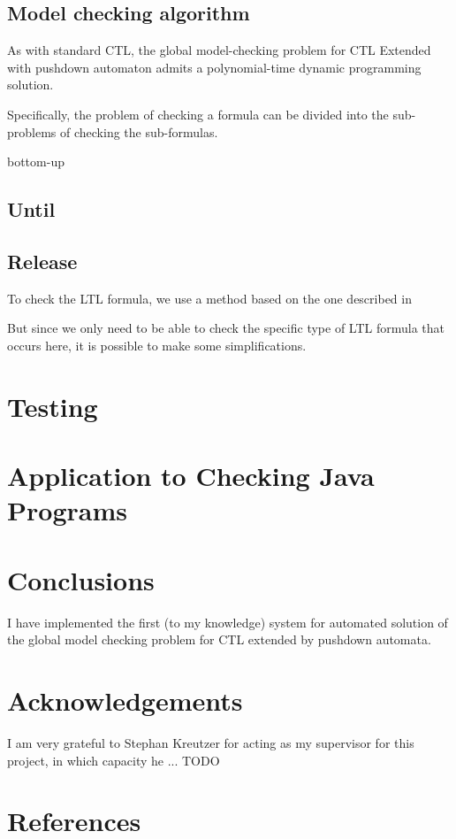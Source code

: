 \documentclass[11pt]{article}
\begin{document}
\subsection{Model checking algorithm}

As with standard CTL, the global model-checking problem for CTL Extended with
pushdown automaton admits a polynomial-time dynamic programming solution.

Specifically, the problem of checking a formula can be divided into the
sub-problems of checking the sub-formulas. %

bottom-up


\subsection{Until}

\subsection{Release}
To check the LTL formula, we use a method based on the one described in \cite{EHRS00b} %

But since we only need to be able to check the specific type of LTL formula
that occurs here, it is possible to make some simplifications.

\section{Testing}

\section{Application to Checking Java Programs}

\section{Conclusions}

I have implemented the first (to my knowledge) system for automated solution of
the global model checking problem for CTL extended by pushdown automata.

\section{Acknowledgements}

I am very grateful to Stephan Kreutzer for acting as my supervisor for this project, in which capacity he ... TODO


\section{References}
{}

\end{document}
